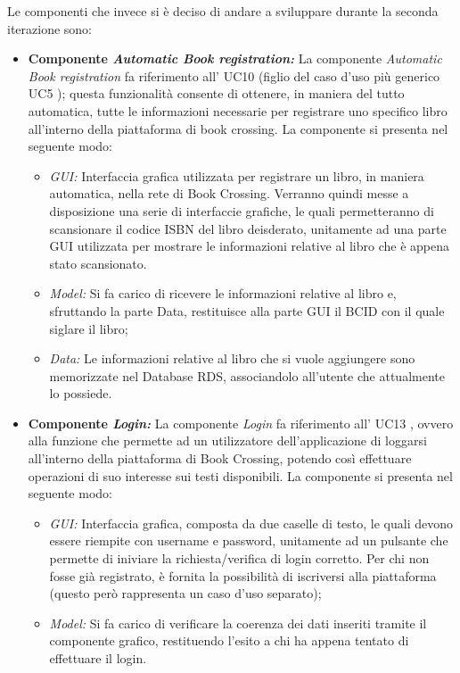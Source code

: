 Le componenti che invece si è deciso di andare a sviluppare durante la seconda iterazione sono: 
\begin{itemize}
	\item \textbf{Componente \textit{Automatic Book registration:}} La componente \textit{Automatic Book registration} fa riferimento all’ UC10
	(figlio del caso d'uso più generico UC5 
	); questa funzionalità consente di ottenere, in maniera del tutto automatica, tutte le informazioni necessarie per registrare uno specifico libro all'interno della piattaforma di book crossing. La componente si presenta nel seguente modo:
	\begin{itemize}
		\item \textit{GUI:} Interfaccia grafica utilizzata per registrare un libro, in maniera automatica, nella rete di Book Crossing. Verranno quindi messe a disposizione una serie di interfaccie grafiche, le quali permetteranno di scansionare il codice ISBN del libro deisderato, unitamente ad una parte GUI utilizzata per mostrare le informazioni relative al libro che è appena stato scansionato.
		\item \textit{Model:} Si fa carico di ricevere le informazioni relative al libro e, sfruttando la parte Data, restituisce alla parte GUI il BCID con il quale siglare il libro;
		\item \textit{Data:} Le informazioni relative al libro che si vuole aggiungere sono memorizzate nel Database RDS, associandolo all'utente che attualmente lo possiede. 
	\end{itemize}
	\item \textbf{Componente \textit{Login:}}  La componente \textit{Login} fa riferimento all’ UC13 
	, ovvero alla funzione che permette ad un utilizzatore dell'applicazione di loggarsi all'interno della piattaforma di Book Crossing, potendo così effettuare operazioni di suo interesse sui testi disponibili. La componente si presenta nel seguente modo:
	\begin{itemize}
		\item \textit{GUI:} Interfaccia grafica, composta da due caselle di testo, le quali devono essere riempite con username e password, unitamente ad un pulsante che permette di iniviare la richiesta/verifica di login corretto. Per chi non fosse già registrato, è fornita la possibilità di iscriversi alla piattaforma (questo però rappresenta un caso d'uso separato);
		\item \textit{Model:} Si fa carico di verificare la coerenza dei dati inseriti tramite il componente grafico, restituendo l'esito a chi ha appena tentato di effettuare il login.

\end{itemize}
\end{itemize}
